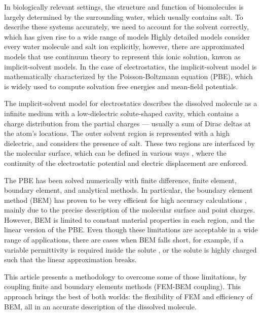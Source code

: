 In biologically relevant settings, the structure and function of biomolecules is largely determined by the surrounding water, which usually contains salt. 
To describe these systems accurately, we need to account for the solvent correctly, which has given rise to a wide range of models \cite{onufriev2018water}
Highly detailed models consider every water molecule and salt ion explicitly, however, there are approximated models that use continuum theory to represent this ionic solution, knwon as implicit-solvent models\cite{RouxSimonson1999,DecherchiETal2015}.
In the case of electrostatics, the implicit-solvent model is mathematically characterized by the Poisson-Boltzmann equation (PBE)\cite{Baker2004,Bardhan2012}, which is widely used to compute solvation free energies and mean-field potentials.

The implicit-solvent model for electrostatics describes the dissolved molecule as a infinite medium with a low-dielectric solute-shaped cavity, which contains a charge distribution from the partial charges --- usually a sum of Dirac deltas at the atom's locations.
The outer solvent region is represented with a high dielectric, and considers the presence of salt.
These two regions are interfaced by the molecular surface, which can be defined in various ways \cite{HarrisBoschitcshFenley2013}, where the continuity of the electrostatic potential and electric displacement are enforced.

The PBE has been solved numerically with finite difference\cite{BakerETal2001,GilsonETal1985,JurrusETal2018,LiETal2019}, finite element\cite{HolstETal2012,BondEtal2010}, boundary element\cite{AltmanBardhanWhiteTidor09,LuETal2006,GengKrasny2013,CooperBardhanBarba2014}, and analytical\cite{YapHeadgordon2010,FelbergETal2017} methods.
In particular, the boundary element method (BEM) has proven to be very efficient for high accuracy calculations \cite{GengKrasny2013,CooperBardhanBarba2014}, mainly due to the precise description of the molecular surface and point charges. 
However, BEM is limited to constant material properties in each region, and the linear version of the PBE. 
Even though these limitations are acceptable in a wide range of applications, there are cases when BEM falls short, for example, if a variable permittivity is required inside the solute \cite{grant2001smooth,li2013dielectric}, or the solute is highly charged such that the linear approximation breaks\cite{FogolariETal1999}.

This article presents a methodology to overcome some of those limitations, by coupling finite and boundary elements methods (FEM-BEM coupling).
This approach brings the best of both worlds: the flexibility of FEM and efficiency of BEM, all in an accurate description of the dissolved molecule.
